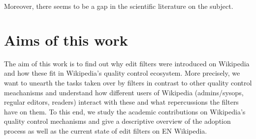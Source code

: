 Moreover, there seems to be a gap in the scientific literature on the subject.

\section{Aims of this work}

The aim of this work is to find out why edit filters were introduced on Wikipedia and how these fit in Wikipedia's quality control ecosystem.
More precisely, we want to unearth the tasks taken over by filters in contrast to other quality control meachanisms
and understand how different users of Wikipedia (admins/sysops, regular editors, readers) interact with these and what repercussions the filters have on them.
To this end, we study the academic contributions on Wikipedia's quality control mechanisms and give a descriptive overview of the adoption process as well as the current state of edit filters on EN Wikipedia.


